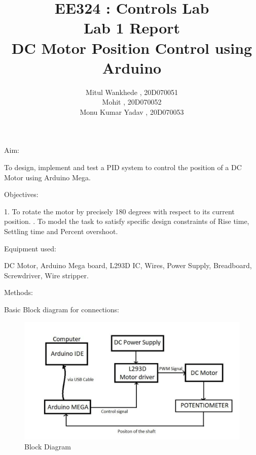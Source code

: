 \documentclass[12pt]{report}
\begin{document}
\author{Mitul Wankhede , 20D070051 \\ Mohit , 20D070052 \\ Monu Kumar Yadav , 20D070053}
\title{ EE324 : Controls Lab \\ Lab 1 Report \\ DC Motor Position Control using Arduino}
\maketitle

\newpage

\begin{Large}
Aim:\\
\end{Large}

To design, implement and test a PID system to control the position of a DC Motor using Arduino Mega.\\

\vspace{15pt}

\begin{Large}
Objectives:\\
\end{Large}

1. To rotate the motor by precisely 180 degrees with respect to its current position. 
. To model the task to satisfy specific design constraints of Rise time, Settling time and Percent overshoot.\\

\vspace{15pt}

\begin{Large}
Equipment used:\\
\end{Large}

DC Motor, Arduino Mega board, L293D IC, Wires, Power Supply, Breadboard, Screwdriver, Wire stripper.\\

\begin{Large}
Methods:\\
\end{Large}


Basic Block diagram for connections:\\

\begin{figure}[h!]
\center
\includegraphics[width=350pt]{Block.png}
\caption{Block Diagram}
\end{figure}
\end{document}
